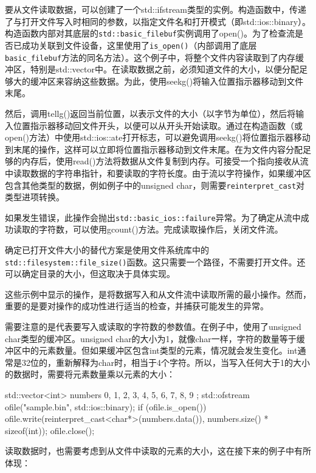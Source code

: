 要从文件读取数据，可以创建了一个std::ifstream类型的实例。构造函数中，传递了与打开文件写入时相同的参数，以指定文件名和打开模式（即std::ios::binary）。构造函数内部对其底层的\verb|std::basic_filebuf|实例调用了open()。为了检查流是否已成功关联到文件设备，这里使用了\verb|is_open()|（内部调用了底层\verb|basic_filebuf|方法的同名方法）。这个例子中，将整个文件内容读取到了内存缓冲区，特别是std::vector中。在读取数据之前，必须知道文件的大小，以便分配足够大的缓冲区来容纳这些数据。为此，使用seekg()将输入位置指示器移动到文件末尾。

然后，调用tellg()返回当前位置，以表示文件的大小（以字节为单位），然后将输入位置指示器移动回文件开头，以便可以从开头开始读取。通过在构造函数（或open()方法）中使用std::ios::ate打开标志，可以避免调用seekg()将位置指示器移动到末尾的操作，这样可以立即将位置指示器移动到文件末尾。在为文件内容分配足够的内存后，使用read()方法将数据从文件复制到内存。可接受一个指向接收从流中读取数据的字符串指针，和要读取的字符长度。由于流以字符操作，如果缓冲区包含其他类型的数据，例如例子中的unsigned char，则需要\verb|reinterpret_cast|对类型进项转换。

如果发生错误，此操作会抛出\verb|std::basic_ios::failure|异常。为了确定从流中成功读取的字符数，可以使用gcount()方法。完成读取操作后，关闭文件流。

\begin{myNotic}
确定已打开文件大小的替代方案是使用文件系统库中的\verb|std::filesystem::file_size()|函数。这只需要一个路径，不需要打开文件。还可以确定目录的大小，但这取决于具体实现。
\end{myNotic}

这些示例中显示的操作，是将数据写入和从文件流中读取所需的最小操作。然而，重要的是要对操作的成功性进行适当的检查，并捕获可能发生的异常。

需要注意的是代表要写入或读取的字符数的参数值。在例子中，使用了unsigned char类型的缓冲区。unsigned char的大小为1，就像char一样，字符的数量等于缓冲区中的元素数量。但如果缓冲区包含int类型的元素，情况就会发生变化。int通常是32位的，重新解释为char时，相当于4个字符。所以，当写入任何大于1的大小的数据时，需要将元素数量乘以元素的大小：

\begin{cpp}
std::vector<int> numbers{ 0, 1, 2, 3, 4, 5, 6, 7, 8, 9 };
std::ofstream ofile("sample.bin", std::ios::binary);
if (ofile.is_open())
{
    ofile.write(reinterpret_cast<char*>(numbers.data()),
                numbers.size() * sizeof(int));
    ofile.close();
}
\end{cpp}

读取数据时，也需要考虑到从文件中读取的元素的大小，这在接下来的例子中有所体现：

